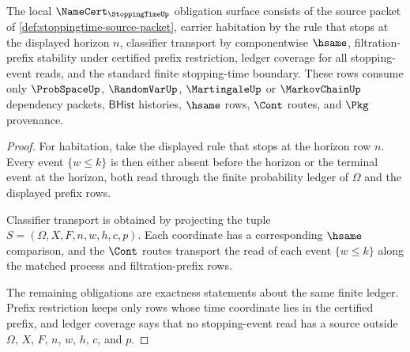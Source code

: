 \begin{theorem}
\label{thm:stoppingtime-namecert-obligation-surface}
The local $\NameCert_{\StoppingTimeUp}$ obligation surface consists of the
source packet of \autoref{def:stoppingtime-source-packet}, carrier habitation
by the rule that stops at the displayed horizon $n$, classifier transport by
componentwise $\hsame$, filtration-prefix stability under certified prefix
restriction, ledger coverage for all stopping-event reads, and the standard
finite stopping-time boundary. These rows consume only $\ProbSpaceUp$,
$\RandomVarUp$, $\MartingaleUp$ or $\MarkovChainUp$ dependency packets,
$\mathsf{BHist}$ histories, $\hsame$ rows, $\Cont$ routes, and $\Pkg$
provenance.
\end{theorem}
\begin{proof}
For habitation, take the displayed rule that stops at the horizon row $n$.
Every event $\{w\leq k\}$ is then either absent before the horizon or the
terminal event at the horizon, both read through the finite probability
ledger of $\Omega$ and the displayed prefix rows.

Classifier transport is obtained by projecting the tuple
$S=(\Omega,X,F,n,w,h,c,p)$. Each coordinate has a corresponding $\hsame$
comparison, and the $\Cont$ routes transport the read of each event
$\{w\leq k\}$ along the matched process and filtration-prefix rows.

The remaining obligations are exactness statements about the same finite
ledger. Prefix restriction keeps only rows whose time coordinate lies in the
certified prefix, and ledger coverage says that no stopping-event read has a
source outside $\Omega$, $X$, $F$, $n$, $w$, $h$, $c$, and $p$.
\end{proof}

